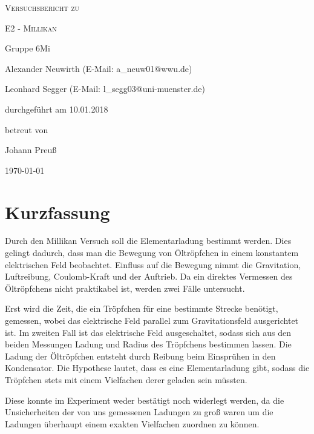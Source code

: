 \documentclass[
	a4paper,
	12pt,
	pagesize,
	ngerman
]{scrartcl}
\begin{document}
	
	\begin{titlepage}
		\centering
		{\scshape\LARGE Versuchsbericht zu \par}
		\vspace{1cm}
		{\scshape\huge E2 - Millikan \par}
		\vspace{2.5cm}
		{\LARGE Gruppe 6Mi \par}
		\vspace{0.5cm}
		
		{\large Alexander Neuwirth (E-Mail: a\_neuw01@wwu.de) \par}
		{\large Leonhard Segger (E-Mail: l\_segg03@uni-muenster.de) \par}
		\vfill
		
		durchgeführt am 10.01.2018\par
		betreut von\par
		{\large Johann Preuß}
		
		\vfill
		
		{\large \today\par}
	\end{titlepage}
	\tableofcontents
	\newpage
	
	\section{Kurzfassung}
	Durch den Millikan Versuch soll die Elementarladung bestimmt werden.
	Dies gelingt dadurch, dass man die Bewegung von Öltröpfchen in einem konstantem elektrischen Feld beobachtet.
	Einfluss auf die Bewegung nimmt die Gravitation, Luftreibung, Coulomb-Kraft und der Auftrieb.
	Da ein direktes Vermessen des Öltröpfchens nicht praktikabel ist, werden zwei Fälle untersucht.

	Erst wird die Zeit, die ein Tröpfchen für eine bestimmte Strecke benötigt, gemessen, wobei das elektrische Feld parallel zum Gravitationsfeld ausgerichtet ist. 
	Im zweiten Fall ist das elektrische Feld ausgeschaltet, sodass sich aus den beiden Messungen Ladung und Radius des Tröpfchens bestimmen lassen.
	Die Ladung der Öltröpfchen entsteht durch Reibung beim Einsprühen in den Kondensator. 
	Die Hypothese lautet, dass es eine Elementarladung gibt, sodass die Tröpfchen stets mit einem Vielfachen derer geladen sein müssten. 

	Diese konnte im Experiment weder bestätigt noch widerlegt werden, da die Unsicherheiten der von uns gemessenen Ladungen zu groß waren um die Ladungen überhaupt einem exakten Vielfachen zuordnen zu können.
\end{document}
